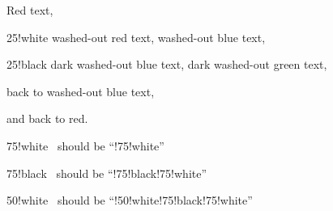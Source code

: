 \documentclass{article}
\begin{document}
\begin{minipage}{3.5cm}\raggedright
\color{red}Red text,
\begin{colormixin}{25!white}
washed-out red text,
\color{blue} washed-out blue text,
\begin{colormixin}{25!black}
dark washed-out blue text,
\color{green} dark washed-out green text,%
\end{colormixin}
back to washed-out blue text,%
\end{colormixin}
and back to red.
\end{minipage}%

\bigskip

\begin{minipage}{\linewidth-6pt}\raggedright
\begin{colormixin}{75!white}
\ should be ``!75!white''\par
\begin{colormixin}{75!black}
\ should be ``!75!black!75!white''\par
\begin{colormixin}{50!white}
\ should be ``!50!white!75!black!75!white''\par
\end{colormixin}
\end{colormixin}
\end{colormixin}
\end{minipage}
\end{document}

